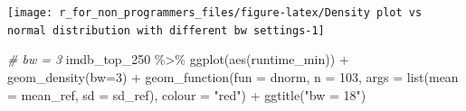 \documentclass[
]{book}
\newenvironment{Shaded}{\begin{snugshade}}{\end{snugshade}}
\newcommand{\AttributeTok}[1]{\textcolor[rgb]{0.77,0.63,0.00}{#1}}
\newcommand{\CommentTok}[1]{\textcolor[rgb]{0.56,0.35,0.01}{\textit{#1}}}
\newcommand{\DecValTok}[1]{\textcolor[rgb]{0.00,0.00,0.81}{#1}}
\newcommand{\FunctionTok}[1]{\textcolor[rgb]{0.00,0.00,0.00}{#1}}
\newcommand{\NormalTok}[1]{#1}
\newcommand{\OtherTok}[1]{\textcolor[rgb]{0.56,0.35,0.01}{#1}}
\newcommand{\SpecialCharTok}[1]{\textcolor[rgb]{0.00,0.00,0.00}{#1}}
\newcommand{\StringTok}[1]{\textcolor[rgb]{0.31,0.60,0.02}{#1}}
\begin{document}
\begin{Shaded}
\end{Shaded}

\begin{center}\texttt{[image: r\_for\_non\_programmers\_files/figure-latex/Density plot vs normal distribution with different bw settings-1]} \end{center}

\begin{Shaded}
\begin{Highlighting}[]
\CommentTok{\# bw = 3}
\NormalTok{imdb\_top\_250 }\SpecialCharTok{\%\textgreater{}\%} 
  \FunctionTok{ggplot}\NormalTok{(}\FunctionTok{aes}\NormalTok{(runtime\_min)) }\SpecialCharTok{+}
  \FunctionTok{geom\_density}\NormalTok{(}\AttributeTok{bw=}\DecValTok{3}\NormalTok{) }\SpecialCharTok{+}
  \FunctionTok{geom\_function}\NormalTok{(}\AttributeTok{fun =}\NormalTok{ dnorm,}
                \AttributeTok{n =} \DecValTok{103}\NormalTok{,}
                \AttributeTok{args =} \FunctionTok{list}\NormalTok{(}\AttributeTok{mean =}\NormalTok{ mean\_ref,}
                            \AttributeTok{sd =}\NormalTok{ sd\_ref),}
                \AttributeTok{colour =} \StringTok{"red"}\NormalTok{) }\SpecialCharTok{+}
    \FunctionTok{ggtitle}\NormalTok{(}\StringTok{"bw = 18"}\NormalTok{)}
\end{Highlighting}
\end{Shaded}
\end{document}
